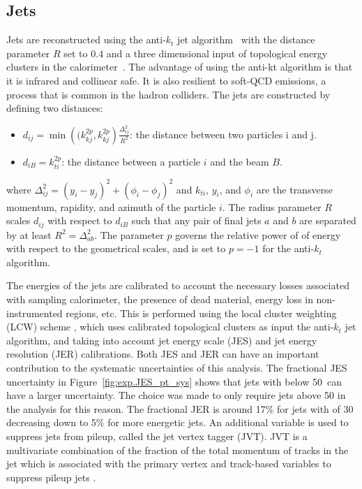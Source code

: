 \subsection{Jets}
Jets are reconstructed using the anti-$k_{t}$ jet algorithm~\cite{Cacciari:2008gp} 
with the distance parameter $R$ set to $0.4$ and 
a three dimensional input of topological energy clusters in the 
calorimeter~\cite{PERF-2014-07}. 
The advantage of using the anti-kt algorithm is that it is infrared and collinear safe.
It is also resilient to soft-QCD emissions, a process that is common in the hadron colliders.
The jets are constructed by defining two distances:
\begin{itemize}
\item $d_{ij} = \min\left((k_{kj}^{2p},k_{kj}^{2p}\right)\frac{\Delta_{ij}^2}{R^2}$: the distance between two particles i and j.
\item $d_{iB} = k_{ti}^{2p}$: the distance between a particle $i$ and the beam $B$.
\end{itemize}
where $\Delta_{ij}^2 = \left( y_i - y_j\right)^2 + \left(\phi_i - \phi_j\right)^2$ and $k_{ti}$, $y_i$, and $\phi_i$ are the transverse momentum, rapidity, and azimuth of the 
particle $i$. The radius parameter $R$ scales $d_{ij}$ with respect to $d_{iB}$ such that any pair of final jets $a$ and $b$ are separated by at least $R^2=\Delta_{ab}^2$.
The parameter $p$ governs the relative power of of energy with respect to the geometrical scales, and is set to $p=-1$ for the anti-$k_{t}$ algorithm.


The energies of the jets are calibrated to  account the necessary losses associated with sampling calorimeter,
the presence of dead material,  energy loss in non-instrumented regions, etc. This is performed using the local cluster weighting
(LCW) scheme \cite{Aad:2016upyew}, which uses calibrated topological clusters as input the anti-$k_{t}$ jet algorithm,
and taking into account jet energy scale (JES) and jet energy resolution (JER) calibrations.
Both JES and JER can have an important contribution to the systematic uncertainties of this analysis.
The fractional JES uncertainty in Figure~\ref{fig:exp.JES_pt_sys} shows that jets with \pt below 50\GeV~can have a larger uncertainty.
The choice was made to only require jets above 50 \GeV in the analysis for this reason.
The fractional JER is around 17\% for jets with \pt of 30 \GeV decreasing down to 5\% for more energetic jets.
An additional variable is used to suppress jets from pileup, called the jet vertex tagger (JVT).
JVT is a multivariate combination of the fraction of the total momentum of tracks in the jet which is associated with the primary vertex
and  track-based variables to suppress pileup jets \cite{ATL-PHYS-PUB-2015-034}. 

